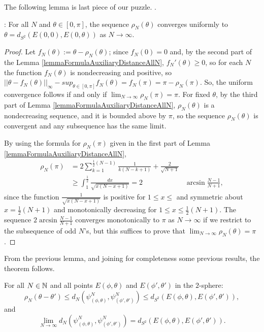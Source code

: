 The following lemma is last piece of our puzzle. \cite{DAndrea2013}.
\begin{lemma}: For all $N$ and $\theta \in [0, \pi]$, the sequence $\rho_N(\theta)$ converges uniformly to $\theta = d_{S^2}(E(0, 0), E(0, \theta))$ as $N\to \infty$. 
\end{lemma}

\begin{proof}
 Let $f_N(\theta) := \theta - \rho_N(\theta)$; since $f_N(0) = 0$ and, by the second part of the Lemma \ref{lemmaFormulaAuxiliaryDistanceAllN}, $f_N'(\theta) \geq 0$, so for each $N$ the function $f_N(\theta)$ is nondecreasing and positive, so $|| \theta - f_N(\theta)||_\infty - sup_{\theta \in [0, \pi]} f_N(\theta) = f_N(\pi) = \pi - \rho_N(\pi)$. So, the uniform convergence follows if and only if $\lim_{N \to \infty} \rho_N(\pi) = \pi$. For fixed $\theta$, by the third part of Lemma \ref{lemmaFormulaAuxiliaryDistanceAllN}, $\rho_N(\theta)$ is a nondecreasing sequence, and it is bounded above by $\pi$, so the sequence $\rho_N(\theta)$ is convergent and any subsequence has the same limit.
 
 By using the formula for $\rho_N(\pi)$ given in the first part of Lemma \ref{lemmaFormulaAuxiliaryDistanceAllN}, 
 \begin{align*}
     \rho_N(\pi) &= 2 \sum_{k = 1}^{\frac{1}{2}(N-1)} \frac{1}{k (N - k + 1)} + \frac{2}{\sqrt{N+1}} \\
     &\geq \int_{1}^{\frac{1}{2}} \frac{dx}{\sqrt{x(N-x+1)}} = 2 &\arcsin \frac{N-1}{N+1},
 \end{align*} since the function $\frac{1}{\sqrt{x(N-x+1)}}$ is positive for $1 \leq x \leq $ and symmetric about $x = \frac{1}{2}(N+1)$ and monotonically decreasing for $1 \leq x \leq \frac{1}{2}(N+1)$. The sequence $2 \arcsin \frac{N-1}{N+1}$ converges monotonically to $\pi$ as $N \to \infty$ if we restrict to the subsequence of odd $N$'s, but this suffices to prove that $\lim_{N \to \infty} \rho_N(\theta) = \pi$.
\end{proof}

From the previous lemma, and joining for completeness some previous results, the theorem follows.
\begin{theorem} \label{theoremdNWithRespectoTodS2}
For all $N \in \mathbb{N}$ and all points $E(\phi, \theta)$ and $E(\phi', \theta')$ in the $2$-sphere:
$$
    \rho_N(\theta - \theta') \leq d_N(\psi^N_{(\phi, \theta)}, \psi^N_{(\phi', \theta')}) \leq d_{S^2}(E(\phi, \theta), E(\phi', \theta')),
$$
and 
\begin{equation}
        \lim_{N \to \infty} d_N(\psi^N_{(\phi, \theta)}, \psi^N_{(\phi', \theta')}) = d_{S^2}(E(\phi, \theta), E(\phi', \theta')).
\end{equation}
\end{theorem}


